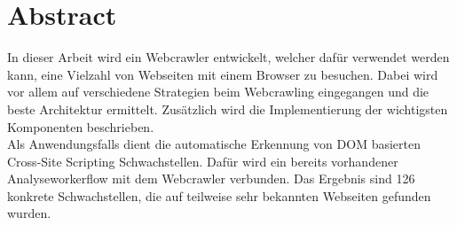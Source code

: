 \chapter*{Abstract} 
In dieser Arbeit wird ein Webcrawler entwickelt, welcher dafür verwendet werden kann, eine Vielzahl von Webseiten mit einem Browser zu besuchen. Dabei wird vor allem auf verschiedene Strategien beim Webcrawling eingegangen und die beste Architektur ermittelt. Zusätzlich wird die Implementierung der wichtigsten Komponenten beschrieben.\\
Als Anwendungsfalls dient die automatische Erkennung von DOM basierten Cross-Site Scripting Schwachstellen. Dafür wird ein bereits vorhandener Analyseworkerflow mit dem Webcrawler verbunden. Das Ergebnis sind 126 konkrete Schwachstellen, die auf teilweise sehr bekannten Webseiten gefunden wurden.
